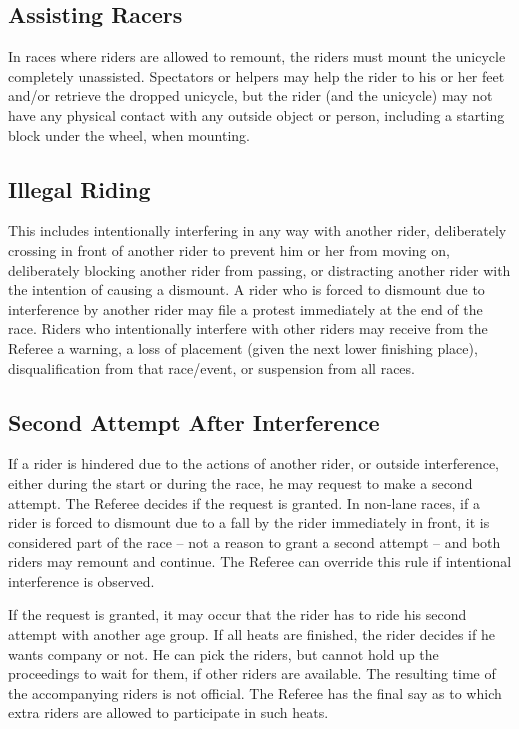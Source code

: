 \subsection{Assisting Racers}

In races where riders are allowed to remount, the riders must mount the unicycle completely unassisted.
Spectators or helpers may help the rider to his or her feet and/or retrieve the dropped unicycle, but the rider (and the unicycle) may not have any physical contact with any outside object or person, including a starting block under the wheel, when mounting.

\subsection{Illegal Riding}

This includes intentionally interfering in any way with another rider, deliberately crossing in front of another rider to prevent him or her from moving on, deliberately blocking another rider from passing, or distracting another rider with the intention of causing a dismount.
A rider who is forced to dismount due to interference by another rider may file a protest immediately at the end of the race.
Riders who intentionally interfere with other riders may receive from the Referee a warning, a loss of placement (given the next lower finishing place), disqualification from that race/event, or suspension from all races.

\subsection{Second Attempt After Interference}
If a rider is hindered due to the actions of another rider, or outside interference, either during the start or during the race, he may request to make a second attempt.
The Referee decides if the request is granted.
In non-lane races, if a rider is forced to dismount due to a fall by the rider immediately in front, it is considered part of the race -- not a reason to grant a second attempt -- and both riders may remount and continue.
The Referee can override this rule if intentional interference is observed.

If the request is granted, it may occur that the rider has to ride his second attempt with another age group.
If all heats are finished, the rider decides if he wants company or not.
He can pick the riders, but cannot hold up the proceedings to wait for them, if other riders are available.
The resulting time of the accompanying riders is not official.
The Referee has the final say as to which extra riders are allowed to participate in such heats.

